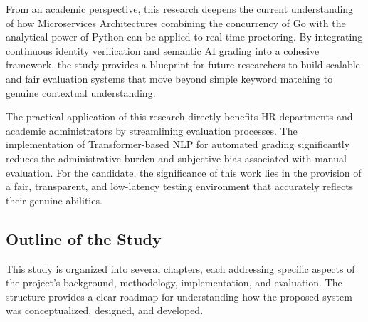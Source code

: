 From an academic perspective, this research deepens the current understanding of how Microservices Architectures combining the concurrency of Go with the analytical power of Python can be applied to real-time proctoring. By integrating continuous identity verification and semantic AI grading into a cohesive framework, the study provides a blueprint for future researchers to build scalable and fair evaluation systems that move beyond simple keyword matching to genuine contextual understanding.

\begin{sloppypar}
The practical application of this research directly benefits HR departments and academic administrators by streamlining evaluation processes. The implementation of Transformer-based NLP for automated grading significantly reduces the administrative burden and subjective bias associated with manual evaluation. For the candidate, the significance of this work lies in the provision of a fair, transparent, and low-latency testing environment that accurately reflects their genuine abilities.
\end{sloppypar}

\subsection{Outline of the Study}
This study is organized into several chapters, each addressing specific aspects of the project’s background, methodology, implementation, and evaluation. The structure provides a clear roadmap for understanding how the proposed system was conceptualized, designed, and developed.

